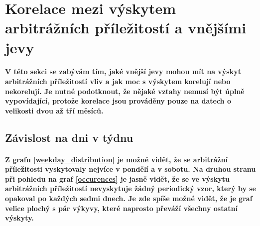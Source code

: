 \documentclass[thesis=B,czech]{FITthesis}[2019/03/21]
\begin{document}
\section{Korelace mezi výskytem arbitrážních příležitostí a vnějšími jevy}
\paragraph{
V této sekci se zabývám tím, jaké vnější jevy mohou mít na výskyt arbitrážních příležitostí vliv a jak moc s výskytem korelují nebo nekorelují. Je nutné podotknout, že nějaké vztahy nemusí být úplně vypovídající, protože korelace jsou prováděny pouze na datech o velikosti dvou až tří měsíců.
}
\subsection{Závislost na dni v týdnu}
\paragraph{
Z grafu \ref{weekday_distribution} je možné vidět, že se arbitrážní příležitosti vyskytovaly nejvíce v pondělí a v sobotu. Na druhou stranu při pohledu na graf \ref{occurences} je jasně vidět, že se ve výskytu arbitrážních příležitostí nevyskytuje žádný periodický vzor, který by se opakoval po každých sedmi dnech. Je zde spíše možné vidět, že je graf velice plochý s pár výkyvy, které naprosto převáží všechny ostatní výskyty.
}
\end{document}
